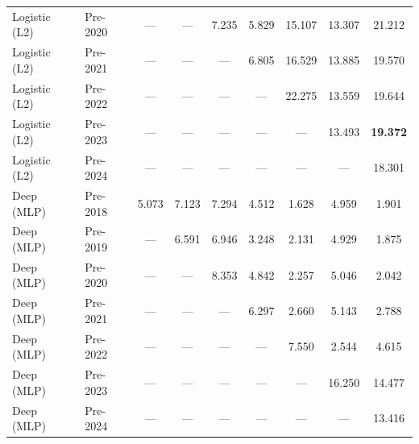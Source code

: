 \begin{table}[htbp]
{\begin{tabular}{l lccccccc}
Logistic (L2) & Pre-2020 & --- & --- & 7.235 & 5.829 & 15.107 & 13.307 & 21.212 \\
Logistic (L2) & Pre-2021 & --- & --- & --- & 6.805 & 16.529 & 13.885 & 19.570 \\
Logistic (L2) & Pre-2022 & --- & --- & --- & --- & 22.275 & 13.559 & 19.644 \\
Logistic (L2) & Pre-2023 & --- & --- & --- & --- & --- & 13.493 & \textbf{19.372} \\
Logistic (L2) & Pre-2024 & --- & --- & --- & --- & --- & --- & 18.301 \\
Deep (MLP) & Pre-2018 & 5.073 & 7.123 & 7.294 & 4.512 & 1.628 & 4.959 & 1.901 \\
Deep (MLP) & Pre-2019 & --- & 6.591 & 6.946 & 3.248 & 2.131 & 4.929 & 1.875 \\
Deep (MLP) & Pre-2020 & --- & --- & 8.353 & 4.842 & 2.257 & 5.046 & 2.042 \\
Deep (MLP) & Pre-2021 & --- & --- & --- & 6.297 & 2.660 & 5.143 & 2.788 \\
Deep (MLP) & Pre-2022 & --- & --- & --- & --- & 7.550 & 2.544 & 4.615 \\
Deep (MLP) & Pre-2023 & --- & --- & --- & --- & --- & 16.250 & 14.477 \\
Deep (MLP) & Pre-2024 & --- & --- & --- & --- & --- & --- & 13.416 \\
\bottomrule
\end{tabular}%
}
\end{table}